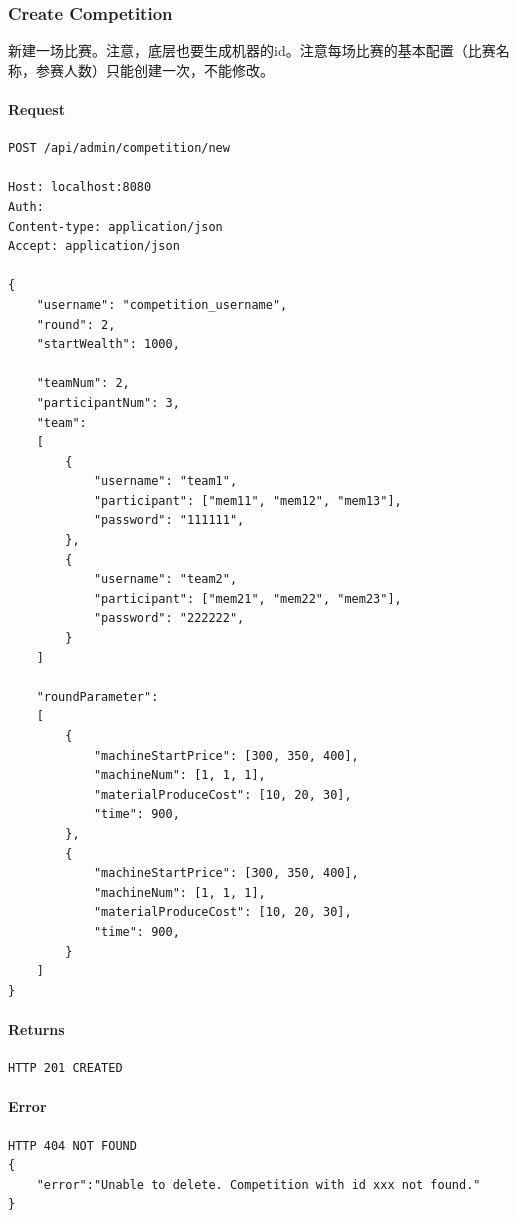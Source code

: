 \documentclass{article}
\begin{document}
\subsubsection{Create Competition}
新建一场比赛。注意，底层也要生成机器的id。注意每场比赛的基本配置（比赛名称，参赛人数）只能创建一次，不能修改。

\paragraph*{Request}
\begin{lstlisting}
POST /api/admin/competition/new

Host: localhost:8080
Auth:
Content-type: application/json
Accept: application/json

{
    "username": "competition_username",
    "round": 2,
    "startWealth": 1000,

    "teamNum": 2,
    "participantNum": 3,
    "team":
    [
        {
            "username": "team1",
            "participant": ["mem11", "mem12", "mem13"],
            "password": "111111",
        },
        {
            "username": "team2",
            "participant": ["mem21", "mem22", "mem23"],
            "password": "222222",
        }
    ]

    "roundParameter":
    [
        {
            "machineStartPrice": [300, 350, 400],
            "machineNum": [1, 1, 1],
            "materialProduceCost": [10, 20, 30],
            "time": 900,
        },
        {
            "machineStartPrice": [300, 350, 400],
            "machineNum": [1, 1, 1],
            "materialProduceCost": [10, 20, 30],
            "time": 900,
        }
    ]
}
\end{lstlisting}

\paragraph*{Returns}
\begin{lstlisting}
HTTP 201 CREATED

\end{lstlisting}

\paragraph*{Error}
\begin{lstlisting}
HTTP 404 NOT FOUND
{
    "error":"Unable to delete. Competition with id xxx not found."
}
\end{lstlisting}
\end{document}
